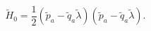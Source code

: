 \begin{equation}
\tilde{H}_{0}=\frac{1}{2}(\tilde{p}_{a}-
\tilde{q}_{a}\tilde{\lambda})(\tilde{p}_{a}-
\tilde{q}_{a}\tilde{\lambda}). \label{htilde}
\end{equation}

